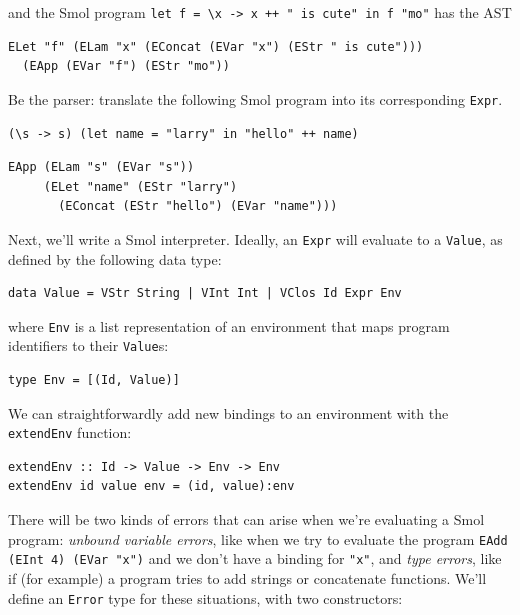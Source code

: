 \documentclass[addpoints]{exam}
\begin{document}
\begin{questions}
and the Smol program \verb|let f = \x -> x ++ " is cute" in f "mo"| has the AST

\begin{verbatim}
ELet "f" (ELam "x" (EConcat (EVar "x") (EStr " is cute")))
  (EApp (EVar "f") (EStr "mo"))
\end{verbatim}

\question[3] Be the parser: translate the following Smol program into its corresponding \verb|Expr|.

\begin{verbatim}
(\s -> s) (let name = "larry" in "hello" ++ name)
\end{verbatim}
\begin{solutionorbox}[\stretch{1}]
\begin{verbatim}
EApp (ELam "s" (EVar "s"))
     (ELet "name" (EStr "larry")
       (EConcat (EStr "hello") (EVar "name")))
\end{verbatim}
\end{solutionorbox}

\newpage

Next, we'll write a Smol interpreter.  Ideally, an \verb|Expr| will evaluate to a \verb|Value|, as defined by the following data type:

\begin{verbatim}
data Value = VStr String | VInt Int | VClos Id Expr Env
\end{verbatim}

where \verb|Env| is a list representation of an environment that maps program identifiers to their \verb|Value|s:

\begin{verbatim}
type Env = [(Id, Value)]
\end{verbatim}

We can straightforwardly add new bindings to an environment with the \verb|extendEnv| function:

\begin{verbatim}
extendEnv :: Id -> Value -> Env -> Env
extendEnv id value env = (id, value):env
\end{verbatim}

There will be two kinds of errors that can arise when we're evaluating a Smol program: \emph{unbound variable errors}, like when we try to evaluate the program \verb|EAdd (EInt 4) (EVar "x")| and we don't have a binding for \verb|"x"|, and \emph{type errors}, like if (for example) a program tries to add strings or concatenate functions.  We'll define an \verb|Error| type for these situations, with two constructors:


\end{questions}
\end{document}
